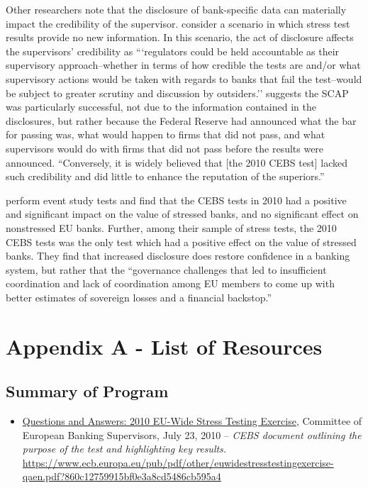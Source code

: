 \documentclass[12pt]{article}
\begin{document}
Other researchers note that the disclosure of bank-specific data can materially impact the credibility of the supervisor. \citet{Itay} consider a scenario in which stress test results provide no new information. In this scenario, the act of disclosure affects the supervisors' credibility as ```regulators could be held accountable as their supervisory approach--whether in terms of how credible the tests are and/or what supervisory actions would be taken with regards to banks that fail the test--would be subject to greater scrutiny and discussion by outsiders.'' \citet{Itay} suggests the SCAP was particularly successful, not due to the information contained in the disclosures, but rather because the Federal Reserve had announced what the bar for passing was, what would happen to firms that did not pass, and what supervisors would do with firms that did not pass before the results were announced. ``Conversely, it is widely believed that [the 2010 CEBS test] lacked such credibility and did little to enhance the reputation of the superiors.''

\citet{Candelon} perform event study tests and find that the CEBS tests in 2010 had a positive and significant impact on the value of stressed banks, and no significant effect on nonstressed EU banks. Further, among their sample of stress tests, the 2010 CEBS tests was the only test which had a positive effect on the value of stressed banks. They find that increased disclosure does restore confidence in a banking system, but rather that the ``governance challenges that led to insufficient coordination and lack of coordination among EU members to come up with better estimates of sovereign losses and a financial backstop.''

\newpage
{}


\nocite{*}


\newpage


\section{Appendix A - List of Resources}

\subsection{Summary of Program}

\begin{itemize}
\item
\ul{Questions and Answers: 2010 EU-Wide Stress Testing Exercise}, Committee of European Banking Supervisors, July 23, 2010 -- \emph{CEBS
 document outlining the purpose of the test and highlighting key results.} \url{https://www.ecb.europa.eu/pub/pdf/other/euwidestresstestingexercise-qaen.pdf?860c12759915bf0e3a8cd5486cb595a4}
\end{itemize}
\end{document}
